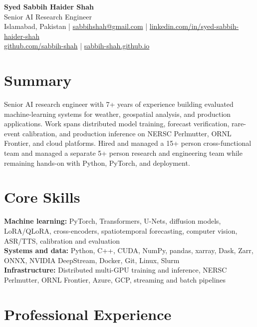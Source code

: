 \documentclass[10pt,letterpaper]{article}
\begin{document}
\begin{center}
  {\LARGE\textbf{Syed Sabbih Haider Shah}}\\[3pt]
  {\large Senior AI Research Engineer}\\[5pt]
  Islamabad, Pakistan \enspace|\enspace
  \href{mailto:sabbihshah@gmail.com}{sabbihshah@gmail.com} \enspace|\enspace
  \href{https://www.linkedin.com/in/syed-sabbih-haider-shah}{linkedin.com/in/syed-sabbih-haider-shah}\\
  \href{https://github.com/sabbih-shah}{github.com/sabbih-shah} \enspace|\enspace
  \href{https://sabbih-shah.github.io}{sabbih-shah.github.io}
\end{center}

\section*{Summary}
Senior AI research engineer with 7+ years of experience building evaluated machine-learning systems for weather, geospatial analysis, and production applications. Work spans distributed model training, forecast verification, rare-event calibration, and production inference on NERSC Perlmutter, ORNL Frontier, and cloud platforms. Hired and managed a 15+ person cross-functional team and managed a separate 5+ person research and engineering team while remaining hands-on with Python, PyTorch, and deployment.

\section*{Core Skills}
\textbf{Machine learning:} PyTorch, Transformers, U-Nets, diffusion models, LoRA/QLoRA, cross-encoders, spatiotemporal forecasting, computer vision, ASR/TTS, calibration and evaluation\\
\textbf{Systems and data:} Python, C++, CUDA, NumPy, pandas, xarray, Dask, Zarr, ONNX, NVIDIA DeepStream, Docker, Git, Linux, Slurm\\
\textbf{Infrastructure:} Distributed multi-GPU training and inference, NERSC Perlmutter, ORNL Frontier, Azure, GCP, streaming and batch pipelines

\section*{Professional Experience}
\end{document}
